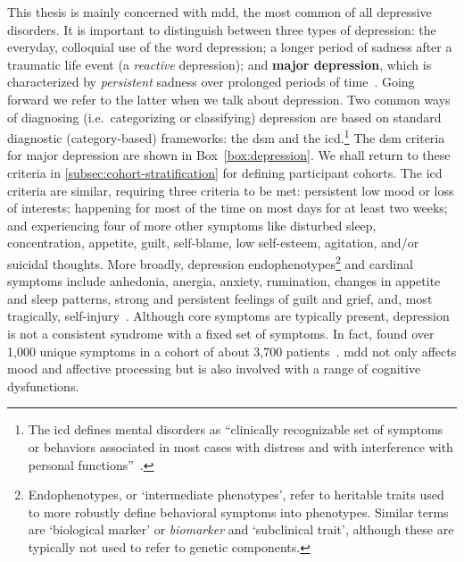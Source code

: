 This thesis is mainly concerned with \gls{mdd}, the most common of all depressive disorders.
It is important to distinguish between three types of depression: the everyday, colloquial use of the word depression; a longer period of sadness after a traumatic life event (a \emph{reactive} depression); and \textbf{major depression}, which is characterized by \emph{persistent} sadness over prolonged periods of time~\parencite{Otte2016}.
Going forward we refer to the latter when we talk about depression.
Two common ways of diagnosing (i.e.~categorizing or classifying) depression are based on standard diagnostic (category-based) frameworks: the \gls{dsm} and the \gls{icd}.\footnote{The \gls{icd} defines mental disorders as ``clinically recognizable set of symptoms or behaviors associated in most cases with distress and with interference with personal functions''~\parencite{WHO1992}.}
The \gls{dsm} criteria for major depression are shown in Box~\ref{box:depression}.
We shall return to these criteria in \cref{subsec:cohort-stratification} for defining participant cohorts.
The \gls{icd} criteria are similar, requiring three criteria to be met: persistent low mood or loss of interests; happening for most of the time on most days for at least two weeks; and experiencing four of more other symptoms like disturbed sleep, concentration, appetite, guilt, self-blame, low self-esteem, agitation, and/or suicidal thoughts.
More broadly, depression endophenotypes\footnote{Endophenotypes, or `intermediate phenotypes', refer to heritable traits used to more robustly define behavioral symptoms into phenotypes. Similar terms are `biological marker' or \emph{biomarker} and `subclinical trait', although these are typically not used to refer to genetic components.} and cardinal symptoms include anhedonia, anergia, anxiety, rumination, changes in appetite and sleep patterns, strong and persistent feelings of guilt and grief, and, most tragically, self-injury~\parencite{Goldstein2014, Pizzagalli2014}.
Although core symptoms are typically present, depression is not a consistent syndrome with a fixed set of symptoms.
In fact, \textcite{Fried2015} found over 1,000 unique symptoms in a cohort of about 3,700 patients~\parencite[see also][]{Fried2015b}.
\Gls{mdd} not only affects mood and affective processing but is also involved with a range of cognitive dysfunctions.

